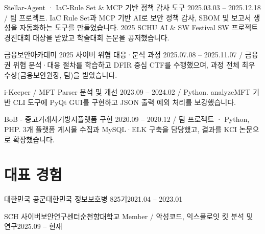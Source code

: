     \resumeProject
      {Stellar-Agent · IaC-Rule Set \& MCP 기반 정책 감사 도구}
      {2025.03.03 -- 2025.12.18 / 팀 프로젝트. IaC Rule Set과 MCP 기반 AI로 보안 정책 감사, SBOM 및 보고서 생성을 자동화하는 도구를 만들었습니다. 2025 SCHU AI \& SW Festival SW 프로젝트 경진대회 대상을 받았고 학술대회 논문을 공저했습니다.}
      \resumeItemListStart
      \resumeItemListEnd

    \resumeProject
      {금융보안아카데미 2025 사이버 위협 대응·분석 과정}
      {2025.07.08 -- 2025.11.07 / 금융권 위협 분석·대응 절차를 학습하고 DFIR 중심 CTF를 수행했으며, 과정 전체 최우수상(금융보안원장, 팀)을 받았습니다.}
      \resumeItemListStart
      \resumeItemListEnd

    \resumeProject
      {i-Keeper / MFT Parser 분석 및 개선}
      {2023.09 -- 2024.02 / Python. analyzeMFT 기반 CLI 도구에 PyQt GUI를 구현하고 JSON 출력 예외 처리를 보강했습니다.}

    \resumeProject
      {BoB - 중고거래사기방지플랫폼 구현}
      {2020.09 -- 2020.12 / 팀 프로젝트 · Python, PHP. 3개 플랫폼 게시물 수집과 MySQL·ELK 구축을 담당했고, 결과를 KCI 논문으로 확장했습니다.}
  \resumeSubHeadingListEnd

\section{대표 경험}
  \resumeSubHeadingListStart
    \resumeSubheading
      {대한민국 공군}{대한민국}
      {정보보호병 825기}{2021.04 -- 2023.01}
      \resumeItemListStart
      \resumeItemListEnd

    \resumeSubheading
      {SCH 사이버보안연구센터}{순천향대학교}
      {Member / 악성코드, 익스플로잇 킷 분석 및 연구}{2025.09 -- 현재}
      \resumeItemListStart
      \resumeItemListEnd

